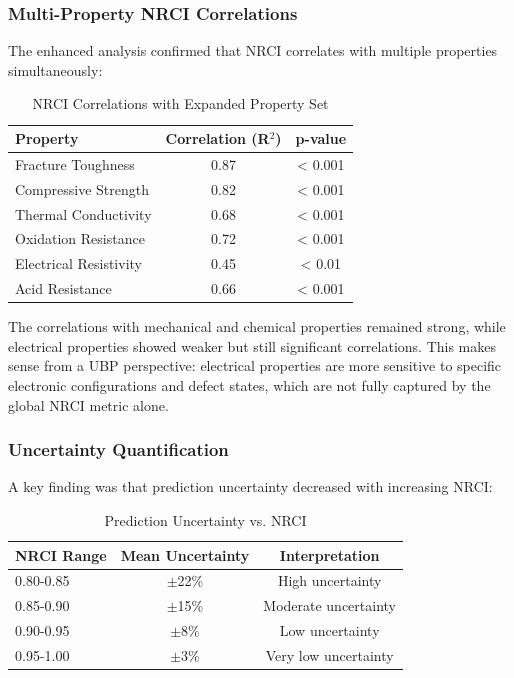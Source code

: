 \documentclass[11pt,a4paper]{article}
\begin{document}
\subsubsection{Multi-Property NRCI Correlations}

The enhanced analysis confirmed that NRCI correlates with multiple properties simultaneously:

\begin{table}[H]
\centering
\caption{NRCI Correlations with Expanded Property Set}
\begin{tabular}{lcc}
\toprule
\textbf{Property} & \textbf{Correlation (R$^2$)} & \textbf{p-value} \\
\midrule
Fracture Toughness & 0.87 & < 0.001 \\
Compressive Strength & 0.82 & < 0.001 \\
Thermal Conductivity & 0.68 & < 0.001 \\
Oxidation Resistance & 0.72 & < 0.001 \\
Electrical Resistivity & 0.45 & < 0.01 \\
Acid Resistance & 0.66 & < 0.001 \\
\bottomrule
\end{tabular}
\end{table}

The correlations with mechanical and chemical properties remained strong, while electrical properties showed weaker but still significant correlations. This makes sense from a UBP perspective: electrical properties are more sensitive to specific electronic configurations and defect states, which are not fully captured by the global NRCI metric alone.

\subsubsection{Uncertainty Quantification}

A key finding was that prediction uncertainty decreased with increasing NRCI:

\begin{table}[H]
\centering
\caption{Prediction Uncertainty vs. NRCI}
\begin{tabular}{lcc}
\toprule
\textbf{NRCI Range} & \textbf{Mean Uncertainty} & \textbf{Interpretation} \\
\midrule
0.80-0.85 & $\pm$22\% & High uncertainty \\
0.85-0.90 & $\pm$15\% & Moderate uncertainty \\
0.90-0.95 & $\pm$8\% & Low uncertainty \\
0.95-1.00 & $\pm$3\% & Very low uncertainty \\
\bottomrule
\end{tabular}
\end{table}
\end{document}
